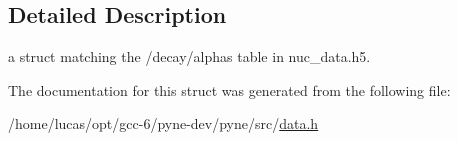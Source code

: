 \subsection{Detailed Description}
a struct matching the \textquotesingle{}/decay/alphas\textquotesingle{} table in nuc\+\_\+data.\+h5. 

The documentation for this struct was generated from the following file\+:\begin{DoxyCompactItemize}
\item 
/home/lucas/opt/gcc-\/6/pyne-\/dev/pyne/src/\hyperlink{data_8h}{data.\+h}\end{DoxyCompactItemize}
